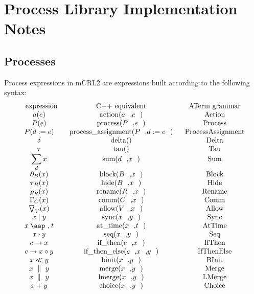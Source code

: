 \documentclass{article}
\providecommand{\at}{\mathbin{\mbox{\aap ,}}}
\providecommand{\leftmerge}{\mathbin{\mathrel{\llfloor}}}
\begin{document}
\section{Process Library Implementation Notes}

\subsection{Processes}

Process expressions in mCRL2 are expressions built according to the
following syntax:%
\[
\begin{array}{ccc}
\text{expression} & \text{C++ equivalent} & \text{ATerm grammar} \\ 
a(e) & \text{action(}a\text{,}e\text{)} & \text{Action} \\ 
P(e) & \text{process(}P\text{,}e\text{)} & \text{Process} \\ 
P(d:=e) & \text{process\_assignment(}P\text{,}d:=e\text{)} & \text{%
ProcessAssignment} \\ 
\delta & \text{delta()} & \text{Delta} \\ 
\tau & \text{tau()} & \text{Tau} \\ 
\dsum\limits_{d}x & \text{sum(}d\text{,}x\text{)} & \text{Sum} \\ 
\partial _{B}(x) & \text{block(}B\text{,}x\text{)} & \text{Block} \\ 
\tau _{B}(x) & \text{hide(}B\text{,}x\text{)} & \text{Hide} \\ 
\rho _{R}(x) & \text{rename(}R\text{,}x\text{)} & \text{Rename} \\ 
\Gamma _{C}(x) & \text{comm(}C\text{,}x\text{)} & \text{Comm} \\ 
\bigtriangledown _{V}(x) & \text{allow(}V\text{,}x\text{)} & \text{Allow} \\ 
x\mid y & \text{sync(}x\text{,}y\text{)} & \text{Sync} \\ 
x\at t & \text{at\_time(}x\text{,}t\text{)} & \text{AtTime} \\ 
x\cdot y & \text{seq(}x\text{,}y\text{)} & \text{Seq} \\ 
c\rightarrow x & \text{if\_then(}c\text{,}x\text{)} & \text{IfThen} \\ 
c\rightarrow x\diamond y & \text{if\_then\_else(}c\text{,}x\text{,}y\text{)}
& \text{IfThenElse} \\ 
x\ll y & \text{binit(}x\text{,}y\text{)} & \text{BInit} \\ 
x\ \parallel \ y & \text{merge(}x\text{,}y\text{)} & \text{Merge} \\ 
x\ \leftmerge \ y & \text{lmerge(}x\text{,}y\text{)} & \text{LMerge} \\ 
x+y & \text{choice(}x\text{,}y\text{)} & \text{Choice}%
\end{array}%
\]
\end{document}
